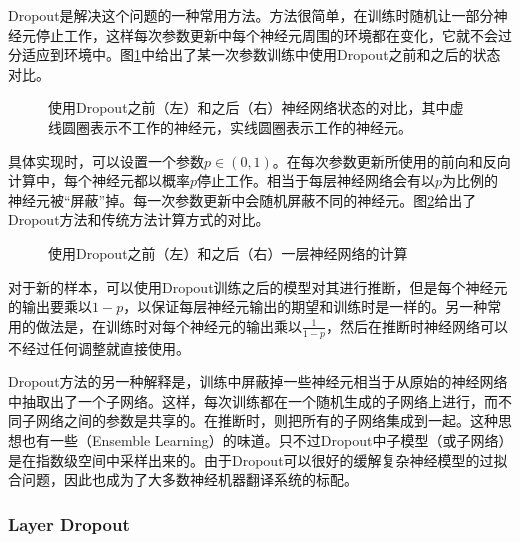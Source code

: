 \parinterval Dropout是解决这个问题的一种常用方法\cite{DBLP:journals/corr/abs-1207-0580}。方法很简单，在训练时随机让一部分神经元停止工作，这样每次参数更新中每个神经元周围的环境都在变化，它就不会过分适应到环境中。图\ref{fig:7-13}中给出了某一次参数训练中使用Dropout之前和之后的状态对比。

\begin{figure}[htp]
\centering

\caption{使用Dropout之前（左）和之后（右）神经网络状态的对比，其中虚线圆圈表示不工作的神经元，实线圆圈表示工作的神经元。}
\label{fig:7-13}
\end{figure}

\parinterval 具体实现时，可以设置一个参数$p\in (0,1)$。在每次参数更新所使用的前向和反向计算中，每个神经元都以概率$p$停止工作。相当于每层神经网络会有以$p$为比例的神经元被``屏蔽''掉。每一次参数更新中会随机屏蔽不同的神经元。图\ref{fig:7-14}给出了Dropout方法和传统方法计算方式的对比。

\begin{figure}[htp]
\centering

\caption{使用Dropout之前（左）和之后（右）一层神经网络的计算}
\label{fig:7-14}
\end{figure}

\parinterval 对于新的样本，可以使用Dropout训练之后的模型对其进行推断，但是每个神经元的输出要乘以$1-p$，以保证每层神经元输出的期望和训练时是一样的。另一种常用的做法是，在训练时对每个神经元的输出乘以$\frac{1}{1-p}$，然后在推断时神经网络可以不经过任何调整就直接使用。

\parinterval Dropout方法的另一种解释是，训练中屏蔽掉一些神经元相当于从原始的神经网络中抽取出了一个子网络。这样，每次训练都在一个随机生成的子网络上进行，而不同子网络之间的参数是共享的。在推断时，则把所有的子网络集成到一起。这种思想也有一些{\small{}}（Ensemble Learning）的味道。只不过Dropout中子模型（或子网络）是在指数级空间中采样出来的。由于Dropout可以很好的缓解复杂神经模型的过拟合问题，因此也成为了大多数神经机器翻译系统的标配。


\subsubsection{Layer Dropout}

